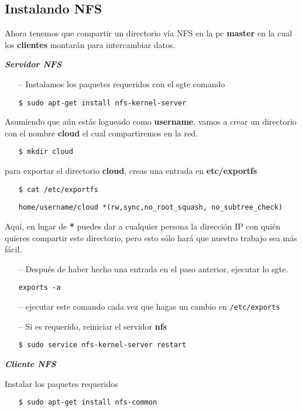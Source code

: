 \documentclass[conference]{IEEEtran}
\begin{document}
\subsection{Instalando NFS}
Ahora tenemos que compartir un directorio vía NFS en la pc \textbf{master} en la
cual los \textbf{clientes} montarán para intercambiar datos.

\textbf{\textit{Servidor NFS}}
\begin{enumerate}
  \item[--] Instalamos los paquetes requeridos con el sgte comando
  \item[] \texttt{\$ sudo apt-get install nfs-kernel-server}
\end{enumerate}
Asumiendo que aún estás logueado como \textbf{username}, vamos a crear un directorio con el
nombre \textbf{cloud} el cual compartiremos en la red.
\begin{enumerate}[resume]
\item[] \texttt{\$ mkdir cloud}
\end{enumerate}
para exportar el directorio \textbf{cloud}, creas una entrada en \textbf{etc/exportfs}
\begin{enumerate}[resume]
\item[] \texttt{\$ cat /etc/exportfs}
\item[] \texttt{\/home/username/cloud *(rw,sync,no\_root\_squash, no\_subtree\_check)}
\end{enumerate}
Aquí, en lugar de \textbf{*} puedes dar a cualquier persona la dirección IP con quién
quieres compartir este directorio, pero esto sólo hará que nuestro trabajo sea más fácil.
\begin{enumerate}[resume]
\item[--] Después de haber hecho una entrada en el paso anterior, ejecutar lo sgte.
\item[] \texttt{exports -a}
\item[--] ejecutar este comando cada vez que hagas un cambio en \texttt{/etc/exports}
\item[--] Si es requerido, reiniciar el servidor \textbf{nfs}
\item[] \texttt{\$ sudo service nfs-kernel-server restart}
\end{enumerate}

\textbf{\textit{Cliente NFS}}

Instalar los paquetes requeridos
\begin{enumerate}
  \item[] \texttt{\$ sudo apt-get install nfs-common}
\end{enumerate}
\end{document}
